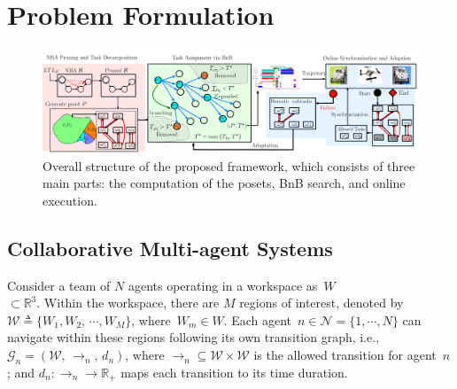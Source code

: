 \section{Problem Formulation}\label{sec:problem}

\begin{figure}[t!]
	\centering
	\includegraphics[width=0.9\linewidth]{figures/logic_fig1.pdf}
	\caption{Overall structure of the proposed framework,
          which consists of three main parts:
        the computation of the posets, BnB search, and online execution.}
	\label{fig:logic_graph}
\end{figure}

\subsection{Collaborative Multi-agent Systems}\label{subsec:multi-agent}

Consider a team of $N$ agents operating in a workspace as~${W}$\\$\subset \mathbb{R}^3$.
Within the workspace, there are $M$ regions of interest,
denoted by ${\mathcal{W}}\triangleq \{{W}_1,{W}_2,\,\cdots,{W}_M\}$,
where~${W}_m\in {W}$.
Each agent~$n\in\mathcal{N}=\{1,\cdots,N\}$ can navigate within these regions
following its own transition graph, i.e., $\mathcal{G}_n=({\mathcal{W}},\,\rightarrow_n,\,d_n)$,
where $\rightarrow_n\subseteq {\mathcal{W}}\times {\mathcal{W}}$
is the allowed transition for agent~$n$;
and $d_n:\rightarrow_n \rightarrow \mathbb{R}_{+}$ maps each transition to its time duration.

